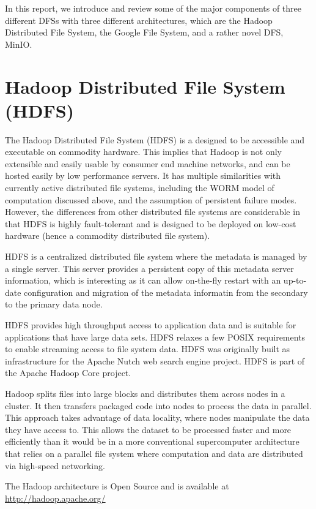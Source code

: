 \documentclass{article}
\begin{document}
In this report, we introduce and review some of the major components of three different DFSs with three different architectures, which are the Hadoop Distributed File System, the Google File System, and a rather novel DFS, MinIO.

\section{Hadoop Distributed File System (HDFS)}

The Hadoop Distributed File System \cite{borthakur2007hadoop} (HDFS) is a designed to be accessible and executable on commodity hardware. This implies that Hadoop is not only extensible and easily usable by consumer end machine networks, and can be hosted easily by low performance servers. It has multiple similarities with currently active distributed file systems, including the WORM model of computation discussed above, and the assumption of persistent failure modes. However, the differences from other distributed file systems are considerable in that HDFS is highly fault-tolerant and is designed to be deployed on low-cost hardware (hence a commodity distributed file system).

HDFS is a centralized distributed file system where the metadata is managed by a single server. This server provides a persistent copy of this metadata server information, which is interesting as it can allow on-the-fly restart with an up-to-date configuration and migration of the metadata informatin from the secondary to the primary data node.

HDFS provides high throughput access to application data and is suitable for applications that have large data sets. HDFS relaxes a few POSIX requirements to enable streaming access to file system data. HDFS was originally built as infrastructure for the Apache Nutch web search engine project. HDFS is part of the Apache Hadoop Core project.

Hadoop splits files into large blocks and distributes them across nodes in a cluster. It then transfers packaged code into nodes to process the data in parallel. This approach takes advantage of data locality, where nodes manipulate the data they have access to. This allows the dataset to be processed faster and more efficiently than it would be in a more conventional supercomputer architecture that relies on a parallel file system where computation and data are distributed via high-speed networking.

The Hadoop architecture is Open Source and is available at \url{http://hadoop.apache.org/}
\end{document}
